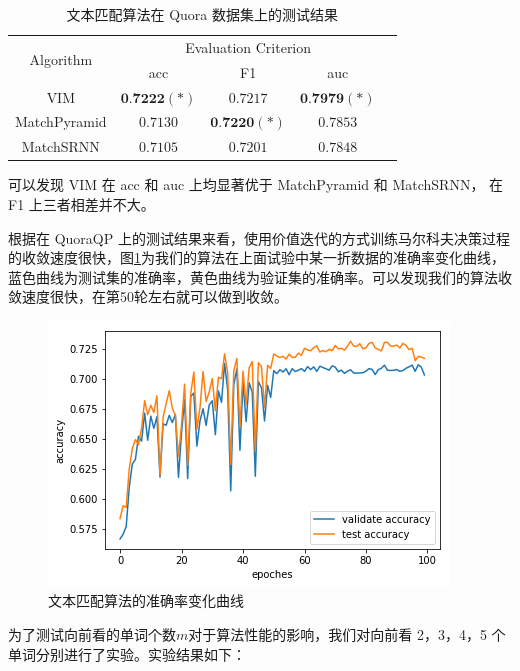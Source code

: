 \begin{table}[htbp]
\caption{文本匹配算法在 Quora 数据集上的测试结果}\label{tab:MDP_test}
\vspace{0.5em}\centering\wuhao
\begin{tabular}{ccccc}
\toprule[1.5pt]
	\multirow{2}{*}{Algorithm} &
	\multicolumn{3}{c}{\multirow{1}{*}{Evaluation Criterion}} \\
	\cline{2-4} & acc & F1 & auc \\
	\midrule[1pt]
	VIM & $\textbf{0.7222}(*)$ & $0.7217$ & $\textbf{0.7979}(*)$ \\
    MatchPyramid & $0.7130$ & $\textbf{0.7220}(*)$ & $0.7853$ \\
    MatchSRNN & $0.7105$ & $0.7201$ & $0.7848$\\
\bottomrule[1.5pt]
\end{tabular}
\vspace{\baselineskip}
\end{table}

可以发现 VIM 在 acc 和 auc 上均显著优于 MatchPyramid 和 MatchSRNN， 在 F1 上三者相差并不大。

根据在 QuoraQP 上的测试结果来看，使用价值迭代的方式训练马尔科夫决策过程的收敛速度很快，图\ref{fig:value_iter_line}为我们的算法在上面试验中某一折数据的准确率变化曲线，蓝色曲线为测试集的准确率，黄色曲线为验证集的准确率。可以发现我们的算法收敛速度很快，在第50轮左右就可以做到收敛。

\begin{figure}[!htbp]
\vspace{1em}
\centering
  \includegraphics[width=0.8\linewidth]{figures/value_iter_line}
  \caption{文本匹配算法的准确率变化曲线}
  \label{fig:value_iter_line}       %
\vspace{1em}
\end{figure}

为了测试向前看的单词个数$m$对于算法性能的影响，我们对向前看 2，3，4，5 个单词分别进行了实验。实验结果如下：

